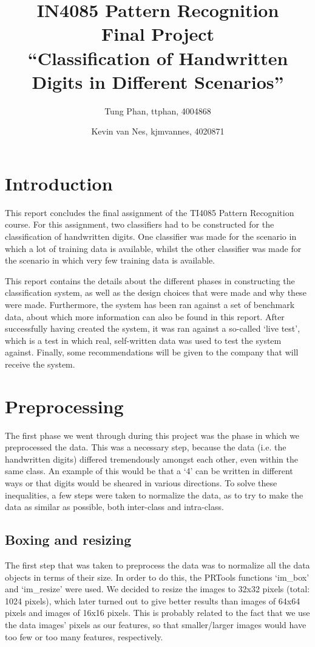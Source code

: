 \documentclass[11pt,twoside,a4paper]{article}
\title{
  IN4085 Pattern Recognition\\
  Final Project\\
  ``Classification of Handwritten Digits in Different Scenarios''
}
\author{
    Tung Phan, ttphan, 4004868 \and
    Kevin van Nes, kjmvannes, 4020871
}
\begin{document}
\maketitle

\section{Introduction}
This report concludes the final assignment of the TI4085 Pattern Recognition course. For this assignment, two classifiers had to be constructed for the classification of handwritten digits. One classifier was made for the scenario in which a lot of training data is available, whilst the other classifier was made for the scenario in which very few training data is available.

This report contains the details about the different phases in constructing the classification system, as well as the design choices that were made and why these were made. Furthermore, the system has been ran against a set of benchmark data, about which more information can also be found in this report. After successfully having created the system, it was ran against a so-called `live test', which is a test in which real, self-written data was used to test the system against. Finally, some recommendations will be given to the company that will receive the system.


\section{Preprocessing}
The first phase we went through during this project was the phase in which we preprocessed the data. This was a necessary step, because the data (i.e. the handwritten digits) differed tremendously amongst each other, even within the same class. An example of this would be that a `4' can be written in different ways or that digits would be sheared in various directions. To solve these inequalities, a few steps were taken to normalize the data, as to try to make the data as similar as possible, both inter-class and intra-class.

\subsection{Boxing and resizing}
The first step that was taken to preprocess the data was to normalize all the data objects in terms of their size. In order to do this, the PRTools functions `im\_box' and `im\_resize' were used. We decided to resize the images to 32x32 pixels (total: 1024 pixels), which later turned out to give better results than images of 64x64 pixels and images of 16x16 pixels. This is probably related to the fact that we use the data images' pixels as our features, so that smaller/larger images would have too few or too many features, respectively.
\end{document}
